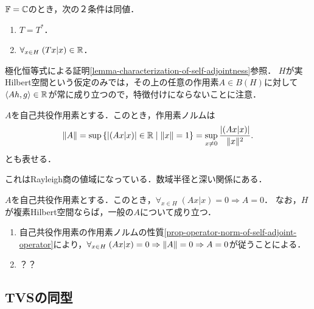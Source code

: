 \documentclass[uplatex,dvipdfmx]{jsreport}
\begin{document}
\begin{corollary}[自己共役作用素の特徴付け]\label{cor-characterization-of-self-adjointness}
    $\mathbb{F}=\mathbb{C}$のとき，次の２条件は同値．
    \begin{enumerate}
        \item $T=T^*$．
        \item $\forall_{x\in H}\;(Tx|x)\in\mathbb{R}$．
    \end{enumerate}
\end{corollary}
\begin{remark}[自己共役作用素の固有値は実数]
    極化恒等式による証明\ref{lemma-characterization-of-self-adjointness}参照．
    $H$が実Hilbert空間という仮定のみでは，その上の任意の作用素$A\in B(H)$に対して$\langle Ah,g\rangle\in\mathbb{R}$が常に成り立つので，特徴付けにならないことに注意．
\end{remark}

\begin{proposition}[自己共役作用素の作用素ノルム]\label{prop-operator-norm-of-self-adjoint-operator}
    $A$を自己共役作用素とする．このとき，作用素ノルムは
    \[\|A\|=\sup\left\{\lvert(Ax|x)\rvert\in\mathbb{R}\mid\|x\|=1\right\}=\sup_{x\ne0}\frac{\lvert(Ax|x)\rvert}{\|x\|^2}.\]
    とも表せる．
\end{proposition}
\begin{remarks}[数域]
    これはRayleigh商の値域になっている．数域半径と深い関係にある．
\end{remarks}

\begin{corollary}[半内積の非退化性]\label{cor-nondegeneratedness-of-semi-inner-product}
    $A$を自己共役作用素とする．このとき，$\forall_{x\in H}\;(Ax|x)=0\Rightarrow A=0$．
    なお，$H$が複素Hilbert空間ならば，一般の$A$について成り立つ．
\end{corollary}
\begin{Proof}\mbox{}
    \begin{enumerate}
        \item 自己共役作用素の作用素ノルムの性質\ref{prop-operator-norm-of-self-adjoint-operator}により，$\forall_{x\in H}\;(Ax|x)=0\Rightarrow\|A\|=0\Rightarrow A=0$が従うことによる．
        \item ？？
    \end{enumerate}
\end{Proof}

\subsection{TVSの同型}
\end{document}
